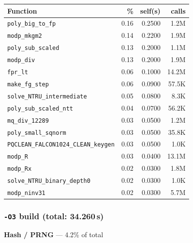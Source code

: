 \documentclass[11pt,a4paper]{article}
\begin{document}
\begin{longtable}{p{7.5cm}rrr}
\toprule
Function & \% & self(s) & calls \\
\midrule
\endhead
  \texttt{poly\_big\_to\_fp} & 0.16 & 0.2500 & 1.2M \\
  \texttt{modp\_mkgm2} & 0.14 & 0.2200 & 1.9M \\
  \texttt{poly\_sub\_scaled} & 0.13 & 0.2000 & 1.1M \\
  \texttt{modp\_div} & 0.13 & 0.2000 & 1.9M \\
  \texttt{fpr\_lt} & 0.06 & 0.1000 & 14.2M \\
  \texttt{make\_fg\_step} & 0.06 & 0.0900 & 57.5K \\
  \texttt{solve\_NTRU\_intermediate} & 0.05 & 0.0800 & 8.3K \\
  \texttt{poly\_sub\_scaled\_ntt} & 0.04 & 0.0700 & 56.2K \\
  \texttt{mq\_div\_12289} & 0.03 & 0.0500 & 1.2M \\
  \texttt{poly\_small\_sqnorm} & 0.03 & 0.0500 & 35.8K \\
  \texttt{PQCLEAN\_FALCON1024\_CLEAN\_keygen} & 0.03 & 0.0500 & 1.0K \\
  \texttt{modp\_R} & 0.03 & 0.0400 & 13.1M \\
  \texttt{modp\_Rx} & 0.02 & 0.0300 & 1.8M \\
  \texttt{solve\_NTRU\_binary\_depth0} & 0.02 & 0.0300 & 1.0K \\
  \texttt{modp\_ninv31} & 0.02 & 0.0300 & 5.7M \\
\bottomrule
\end{longtable}

\subsubsection*{\texttt{-O3} build (total: 34.260\,s)}

\noindent\colorbox{hashcolor}{\strut \textbf{Hash / PRNG} --- 4.2\% of total}
\vspace{2pt}
\end{document}
